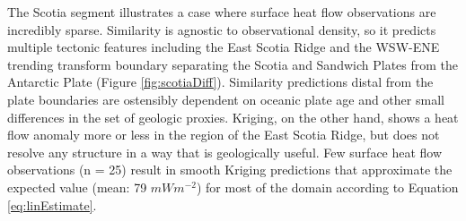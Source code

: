 The Scotia segment illustrates a case where surface heat flow observations are incredibly sparse. Similarity is agnostic to observational density, so it predicts multiple tectonic features including the East Scotia Ridge and the WSW-ENE trending transform boundary separating the Scotia and Sandwich Plates from the Antarctic Plate (Figure \ref{fig:scotiaDiff}). Similarity predictions distal from the plate boundaries are ostensibly dependent on oceanic plate age and other small differences in the set of geologic proxies. Kriging, on the other hand, shows a heat flow anomaly more or less in the region of the East Scotia Ridge, but does not resolve any structure in a way that is geologically useful. Few surface heat flow observations (n = 25) result in smooth Kriging predictions that approximate the expected value (mean: 79 \(mWm^{-2}\)) for most of the domain according to Equation \eqref{eq:linEstimate}.




